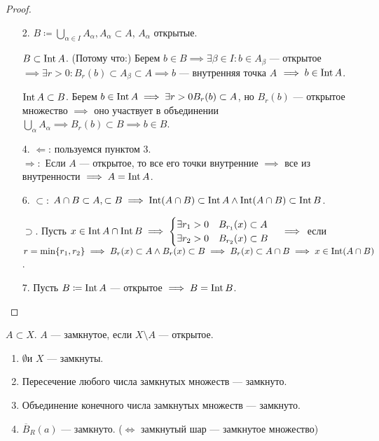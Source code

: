 \begin{proof}
    \slashn
    \begin{enumerate}
        \item[2.] $B \coloneqq \bigcup_{\alpha \in I} A_{\alpha}, A_\alpha \subset A$, $A_\alpha$ открытые.

      $B \subset \operatorname{Int} A$. (Потому что:) Берем  $b \in B \implies \exists \beta \in I\!: b \in A_\beta$ --- открытое  $\implies \exists r > 0\!: B_r(b) \subset A_\beta \subset A \implies b$ --- внутренняя точка  $A$  $\implies b \in \operatorname{Int} A$.

      $\operatorname{Int} A \subset B$. Берем  $b \in \operatorname{Int} A \implies \exists r > 0 B_r(b) \subset A$, но  $B_r(b)$ --- открытое множество $\implies $ оно участвует в объединении  $\bigcup\limits_\alpha A_\alpha \implies B_r(b) \subset B \implies b \in B$.

      \item[4.] $\Leftarrow$: пользуемся пунктом 3.  \\$\Rightarrow:$ Если $A$ --- открытое, то все его точки внутренние  $\implies$ все из внутренности $\implies A = \operatorname{Int} A$.

      \item[6.] $\subset$:  $A \cap B \subset A, \subset B \implies \operatorname{Int}(A \cap B) \subset \operatorname{Int} A \land \operatorname{Int}(A \cap B) \subset \operatorname{Int} B$.

      $\supset$. Пусть $x \in \operatorname{Int} A \cap \operatorname{Int} B \implies \begin{cases} \exists r_1 > 0 \quad B_{r_1}(x) \subset A \\ \exists r_2 > 0 \quad B_{r_2}(x) \subset B \end{cases} \implies$ если $r = \min \{r_1, r_2 \} \implies B_r(x) \subset A \land B_r(x) \subset B \implies B_r(x) \subset A \cap B \implies x \in \operatorname{Int}(A \cap B)$.

      \item[7.] Пусть $B \coloneqq \operatorname{Int} A$ --- открытое $\implies B = \operatorname{Int} B$.
    \end{enumerate}
\end{proof}
\begin{definition}
    $A \subset X$.  $A$ --- замкнутое, если  $X \setminus A$ --- открытое.
\end{definition}
\begin{theorem}
    \begin{enumerate}
        \item $\emptyset$и $X$ --- замкнуты.
        \item Пересечение любого числа замкнутых множеств --- замкнуто. 
        \item Объединение конечного числа замкнутых множеств --- замкнуто.
        \item  $\overline{B}_R(a)$ --- замкнуто. ($\iff$ замкнутый шар --- замкнутое множество)
    \end{enumerate}
\end{theorem}
